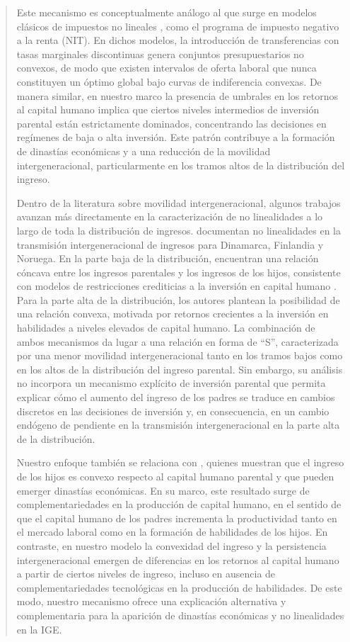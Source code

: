 \documentclass[12pt]{article}
\begin{document}
\begin{abstract}
Este mecanismo es conceptualmente análogo al que surge en modelos clásicos de impuestos no lineales \parencite{Burtless_1978,Hausman_1985}, como el programa de impuesto negativo a la renta (NIT). En dichos modelos, la introducción de transferencias con tasas marginales discontinuas genera conjuntos presupuestarios no convexos, de modo que existen intervalos de oferta laboral que nunca constituyen un óptimo global bajo curvas de indiferencia convexas. De manera similar, en nuestro marco la presencia de umbrales en los retornos al capital humano implica que ciertos niveles intermedios de inversión parental están estrictamente dominados, concentrando las decisiones en regímenes de baja o alta inversión. Este patrón contribuye a la formación de dinastías económicas y a una reducción de la movilidad intergeneracional, particularmente en los tramos altos de la distribución del ingreso.

Dentro de la literatura sobre movilidad intergeneracional, algunos trabajos avanzan más directamente en la caracterización de no linealidades a lo largo de toda la distribución de ingresos. \textcite{Bratsberg_2007} documentan no linealidades en la transmisión intergeneracional de ingresos para Dinamarca, Finlandia y Noruega. En la parte baja de la distribución, encuentran una relación cóncava entre los ingresos parentales y los ingresos de los hijos, consistente con modelos de restricciones crediticias a la inversión en capital humano \parencite{Becker_1986}. Para la parte alta de la distribución, los autores plantean la posibilidad de una relación convexa, motivada por retornos crecientes a la inversión en habilidades a niveles elevados de capital humano. La combinación de ambos mecanismos da lugar a una relación en forma de ``S'', caracterizada por una menor movilidad intergeneracional tanto en los tramos bajos como en los altos de la distribución del ingreso parental. Sin embargo, su análisis no incorpora un mecanismo explícito de inversión parental que permita explicar cómo el aumento del ingreso de los padres se traduce en cambios discretos en las decisiones de inversión y, en consecuencia, en un cambio endógeno de pendiente en la transmisión intergeneracional en la parte alta de la distribución.

Nuestro enfoque también se relaciona con \textcite{Becker_2018}, quienes muestran que el ingreso de los hijos es convexo respecto al capital humano parental y que pueden emerger dinastías económicas. En su marco, este resultado surge de complementariedades en la producción de capital humano, en el sentido de que el capital humano de los padres incrementa la productividad tanto en el mercado laboral como en la formación de habilidades de los hijos. En contraste, en nuestro modelo la convexidad del ingreso y la persistencia intergeneracional emergen de diferencias en los retornos al capital humano a partir de ciertos niveles de ingreso, incluso en ausencia de complementariedades tecnológicas en la producción de habilidades. De este modo, nuestro mecanismo ofrece una explicación alternativa y complementaria para la aparición de dinastías económicas y no linealidades en la IGE.


\end{abstract}
\end{document}
